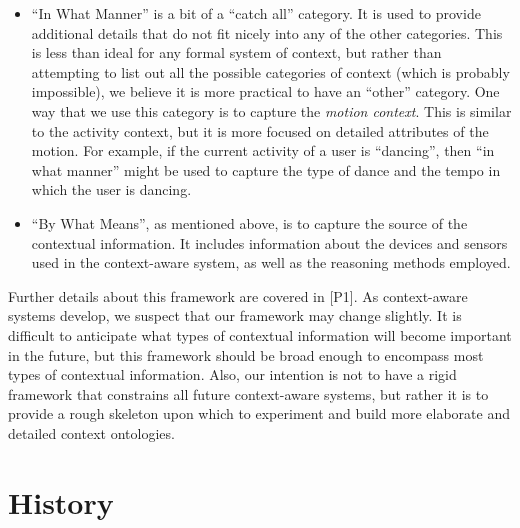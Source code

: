 \begin{itemize}
%
\item ``In What Manner'' is a bit of a ``catch all'' category. It is used to provide additional details that do not fit nicely into any of the other categories. This is less than ideal for any formal system of context, but rather than attempting to list out all the possible categories of context (which is probably impossible), we believe it is more practical to have an ``other'' category. One way that we use this category is to capture the \emph{motion context}. This is similar to the activity context, but it is more focused on detailed attributes of the motion. For example, if the current activity of a user is ``dancing'', then ``in what manner'' might be used to capture the type of dance and the tempo in which the user is dancing.
%
\item ``By What Means'', as mentioned above, is to capture the source of the contextual information. It includes information about the devices and sensors used in the context-aware system, as well as the reasoning methods employed.
\end{itemize}

Further details about this framework are covered in [P1]. As context-aware systems develop, we suspect that our framework may change slightly. It is difficult to anticipate what types of contextual information will become important in the future, but this framework should be broad enough to encompass most types of contextual information. Also, our intention is not to have a rigid framework that constrains all future context-aware systems, but rather it is to provide a rough skeleton upon which to experiment and build more elaborate and detailed context ontologies.

\section{History}
\label{sec:history}

